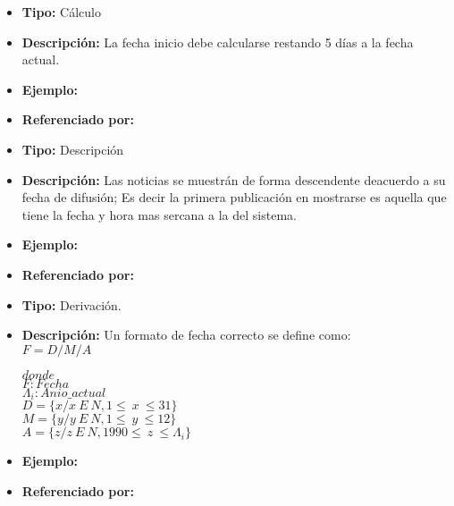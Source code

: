 
    \begin{itemize}
      \item \textbf{Tipo:} Cálculo
      \item \textbf{Descripción:} La fecha inicio debe calcularse restando 5 días a la fecha actual.
      \item \textbf{Ejemplo:} 
      \item \textbf{Referenciado por:}  \\
    \end{itemize}


    \begin{itemize}
      \item \textbf{Tipo:} Descripción
      \item \textbf{Descripción:} Las noticias se muestrán de forma descendente deacuerdo a su fecha de difusión; Es decir la primera publicación en mostrarse es aquella que tiene la fecha y hora mas sercana a la del sistema.
      \item \textbf{Ejemplo:} 
      \item \textbf{Referenciado por:}  \\
    \end{itemize}


    \begin{itemize}
      \item \textbf{Tipo:} Derivación.
      \item \textbf{Descripción:} Un formato de fecha correcto se define como:\\

      $F=D/M/A$

      $donde$\\ 

      $F:Fecha$\\
      $\Lambda_i:Anio\_actual$\\

      $D=\{x/x\ E\ N,1\leq\ x\ \leq31\}$\\
      $M=\{y/y\ E\ N,1\leq\ y\ \leq12\}$\\
      $A=\{z/z\ E\ N,1990\leq\ z\ \leq\Lambda_i\}$\\




      \item \textbf{Ejemplo:} 
      \item \textbf{Referenciado por:}  \\
    \end{itemize}
